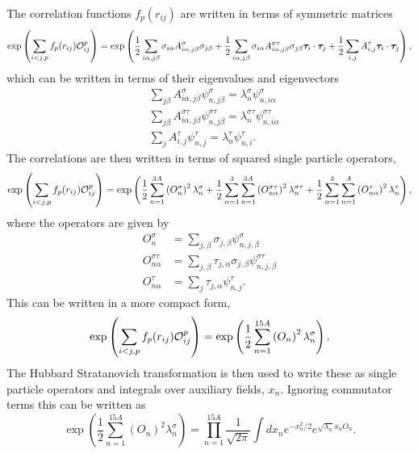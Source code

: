 The correlation functions $f_p(r_{ij})$ are written in terms of symmetric matrices
\begin{equation}
   \exp\left(\sum\limits_{i<j,p}f_p(r_{ij})\mathcal{O}^p_{ij}\right) = \exp\left(\frac{1}{2}\sum\limits_{i\alpha,j\beta} \sigma_{i\alpha}A^{\sigma}_{i\alpha,j\beta}\sigma_{j\beta}
      + \frac{1}{2}\sum\limits_{i\alpha,j\beta} \sigma_{i\alpha}A^{\sigma\tau}_{i\alpha,j\beta}\sigma_{j\beta}\bm{\tau}_i\cdot\bm{\tau}_j
      + \frac{1}{2}\sum\limits_{i,j} A^{\tau}_{i,j}\bm{\tau}_i\cdot\bm{\tau}_j\right),
\end{equation}
which can be written in terms of their eigenvalues and eigenvectors
\begin{align}
   &\sum\limits_{j\beta} A^{\sigma}_{i\alpha,j\beta}\psi^{\sigma}_{n,j\beta} = \lambda^{\sigma}_n\psi^{\sigma}_{n,i\alpha} \\
   &\sum\limits_{j\beta} A^{\sigma\tau}_{i\alpha,j\beta}\psi^{\sigma\tau}_{n,j\beta} = \lambda^{\sigma\tau}_n\psi^{\sigma\tau}_{n,i\alpha} \\
   &\sum\limits_{j} A^{\tau}_{i,j}\psi^{\tau}_{n,j} = \lambda^{\tau}_n\psi^{\tau}_{n,i}.
\end{align}
The correlations are then written in terms of squared single particle operators,
\begin{equation}
   \exp\left(\sum\limits_{i<j,p}f_p(r_{ij})\mathcal{O}^p_{ij}\right) = \exp\left(\frac{1}{2}\sum\limits_{n=1}^{3A} \left(O_{n}^{\sigma}\right)^2 \lambda_n^{\sigma}
      + \frac{1}{2}\sum\limits_{\alpha=1}^{3}\sum\limits_{n=1}^{3A} \left(O_{n\alpha}^{\sigma\tau}\right)^2 \lambda_n^{\sigma\tau}
      + \frac{1}{2}\sum\limits_{\alpha=1}^{3}\sum\limits_{n=1}^{A} \left(O_{n\alpha}^{\tau}\right)^2 \lambda_n^{\tau}\right),
\end{equation}
where the operators are given by
\begin{equation}
\begin{split}
   O_{n}^{\sigma} &= \sum\limits_{j,\beta} \sigma_{j,\beta}\psi_{n,j,\beta}^{\sigma} \\
   O_{n\alpha}^{\sigma\tau} &= \sum\limits_{j,\beta} \tau_{j,\alpha}\sigma_{j,\beta}\psi_{n,j,\beta}^{\sigma\tau} \\
   O_{n\alpha}^{\tau} &= \sum\limits_{j} \tau_{j,\alpha}\psi_{n,j}^{\tau}.
\end{split}
\end{equation}
This can be written in a more compact form,
\begin{equation}
    \exp\left(\sum\limits_{i<j,p}f_p(r_{ij})\mathcal{O}^p_{ij}\right) = \exp\left(\frac{1}{2}\sum\limits_{n=1}^{15A} \left(O_{n}\right)^2 \lambda_n^{\sigma}\right).
\end{equation}
The Hubbard Stratanovich transformation is then used to write these as single particle operators and integrals over auxiliary fields, $x_n$. Ignoring commutator terms this can be written as
\begin{equation}
   \exp\left(\frac{1}{2}\sum\limits_{n=1}^{15A} \left(O_{n}\right)^2 \lambda_n^{\sigma}\right) = \prod\limits_{n=1}^{15A} \frac{1}{\sqrt{2\pi}}\int dx_n e^{-x_n^2/2}e^{\sqrt{\lambda_n}x_nO_n}.
\end{equation}

